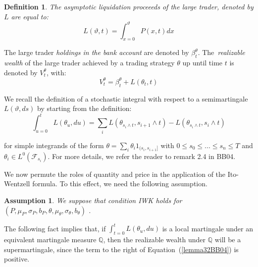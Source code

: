 \documentclass{article}
\newtheorem{definition}{Definition}
\newtheorem{assumption}{Assumption}
\begin{document}


\begin{definition}
The \textit{asymptotic liquidation proceeeds} of the large trader, denoted
by $L$ are equal to:\
\begin{equation*}
L(\vartheta ,t)=\int_{x=0}^{\vartheta }P(x,t)dx
\end{equation*}
\end{definition}

The large trader \textit{holdings in the bank account} are denoted by $\beta
_{t}^{\theta }$. The\textit{\ realizable wealth} of the large trader
achieved by a trading strategy $\theta $ up until time $t$ is denoted by $%
V_{t}^{\theta }$, with:%
\begin{equation*}
V_{t}^{\theta }=\beta _{t}^{\theta }+L(\theta _{t},t)
\end{equation*}

We recall the definition of a stochastic integral with respect to a
semimartingale $L(\vartheta ,ds)$ by starting from the definition:%
\begin{equation*}
\int_{u=0}^{t}L(\theta _{u},du)=\sum_{i}L(\theta _{s_{i}\wedge
t},s_{i+1}\wedge t)-L(\theta _{s_{i}\wedge t},s_{i}\wedge t)
\end{equation*}

for simple integrands of the form $\theta =\sum_{i}\theta
_{i}1_{(s_{i},s_{i+1}]}$ with $0\leq s_{0}\leq ...\leq s_{n}\leq T$ and $%
\theta _{i}\in L^{0}(\mathcal{F}_{s_{i}})$. For more details, we refer the
reader to remark 2.4 in BB04.

\bigskip

We now permute the roles of quantity and price in the application of the
Ito-Wentzell formula. To this effect, we need the following assumption.



\begin{assumption}
\label{ass::iwk_condition_P} We suppose that condition IWK holds for $(P,\mu
_{P},\sigma _{P},b_{P},\theta ,\mu _{\theta },\sigma _{\theta },b_{\theta })$%
.\bigskip
\end{assumption}

The following fact implies that, if $\int_{t=0}^{t}L(\theta _{u},du)$ is a
local martingale under an equivalent martingale measure $\mathbb{Q}$, then
the realizable wealth under $\mathbb{Q}$ will be a supermartingale, since
the term to the right of Equation~(\ref{lemma32BB04}) is positive.
\end{document}
